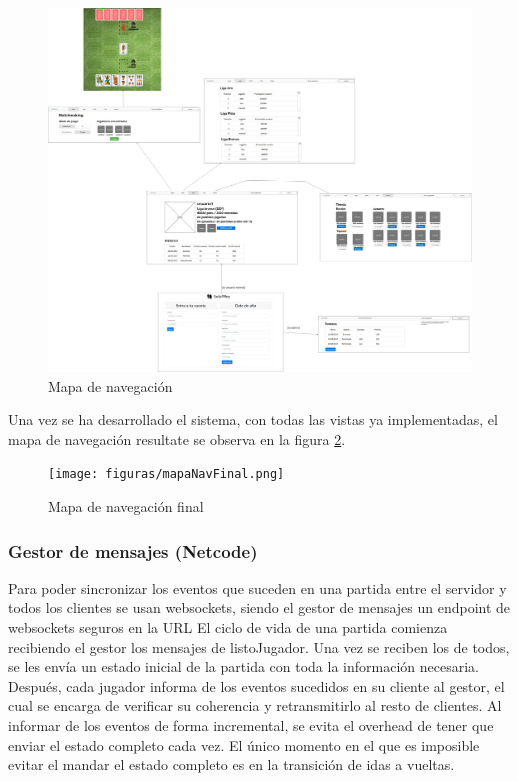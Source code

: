 \begin{figure}
  \includegraphics[width=\linewidth]{figuras/mapaNavegacion.png}
  \caption{Mapa de navegación}
  \label{fig:mapaDeNavegacion}
\end{figure}

Una vez se ha desarrollado el sistema, con todas las vistas ya implementadas, el mapa de navegación resultate se observa en la figura \ref{fig:mapaDeNavegacionFinal}.

\begin{figure}
  \texttt{[image: figuras/mapaNavFinal.png]}
  \caption{Mapa de navegación final}
  \label{fig:mapaDeNavegacionFinal}
\end{figure}

\subsubsection{Gestor de mensajes (Netcode)}

Para poder sincronizar los eventos que suceden en una partida entre el servidor y todos los clientes se usan websockets,
siendo el gestor de mensajes un endpoint de websockets seguros en la URL
El ciclo de vida de una partida comienza recibiendo el gestor los mensajes de listoJugador. Una vez se reciben los de todos,
se les envía un estado inicial de la partida con toda la información necesaria. Después, cada jugador informa de los eventos
sucedidos en su cliente al gestor, el cual se encarga de verificar su coherencia y retransmitirlo al resto de clientes. Al
informar de los eventos de forma incremental, se evita el overhead de tener que enviar el estado completo cada vez. El único
momento en el que es imposible evitar el mandar el estado completo es en la transición de idas a vueltas.\\

